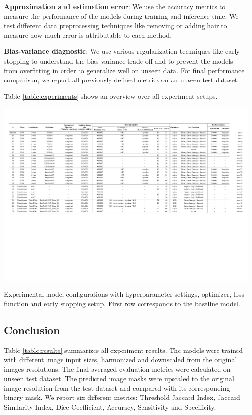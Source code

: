 \textbf{Approximation and estimation error}: We use the accuracy metrics to measure the performance of the models during training and inference time. We test different data preprocessing techniques like removing or adding hair to measure how much error is attributable to each method.

\textbf{Bias-variance diagnostic}: We use various regularization techniques like early stopping to understand the bias-variance trade-off and to prevent the models from overfitting in order to generalize well on unseen data. For final performance comparison, we report all previously defined metrics on an unseen test dataset.

\par
Table \ref{table:experiments} shows an overview over all experiment setups.

\begin{table}[ht]
  \centering
  \includegraphics[width=\textwidth]{assets/experiments.pdf}
  \caption[Experiments]{Experimental model configurations with hyperparameter settings, optimizer, loss function and early stopping setup. First row corresponds to the baseline model.}
  \label{table:experiments}
\end{table}


\subsection{Conclusion}

Table \ref{table:results} summarizes all experiment results. The models were trained with different image input sizes, harmonized and downscaled from the original images resolutions. The final averaged evaluation metrics were calculated on unseen test dataset. The predicted image masks were upscaled to the original image resolution from the test dataset and compared with its corresponding binary mask. We report six different metrics: Threshold Jaccard Index, Jaccard Similarity Index, Dice Coefficient, Accuracy, Sensitivity and Specificity.

